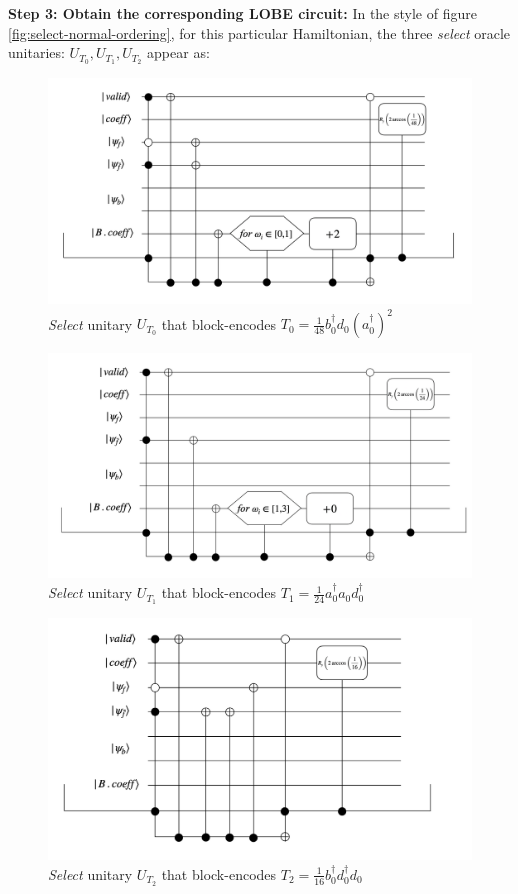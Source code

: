 \textbf{Step 3: Obtain the corresponding LOBE circuit:} In the style of figure \ref{fig:select-normal-ordering}, for this particular Hamiltonian, the three \textit{select} oracle unitaries: $U_{T_0}, U_{T_1}, U_{T_2}$ appear as:
\begin{figure}[h]
    \includegraphics[width = 0.7\linewidth]{figures/T0.png}
    \caption{\textit{Select} unitary $U_{T_0}$ that block-encodes $T_0 = \frac{1}{48}b_0^\dagger d_0(a_0^\dagger)^2$}
\end{figure}
\begin{figure}[h]
    \includegraphics[width = 0.7\linewidth]{figures/T1.png}
    \caption{\textit{Select} unitary $U_{T_1}$ that block-encodes $T_1 = \frac{1}{24}a_0^\dagger a_0 d_0^\dagger$}
\end{figure}
\begin{figure}[h]
    \includegraphics[width = 0.7\linewidth]{figures/T2.png}
    \caption{\textit{Select} unitary $U_{T_2}$ that block-encodes $T_2 = \frac{1}{16}b_0^\dagger d_0^\dagger d_0$}
\end{figure}

